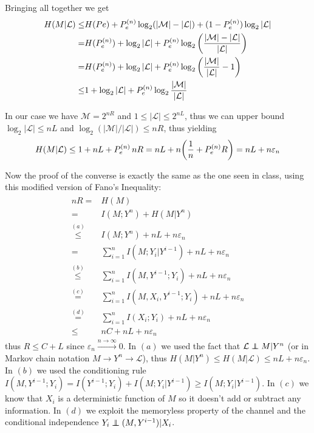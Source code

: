 Bringing all together we get
%
\begin{align}
\begin{split}
H(M|\mathcal{L}) \leq & H(Pe) + P_e^{(n)}\log_2(|\mathcal{M}|-|\mathcal{L}|) + (1-P_e^{(n)})\log_2|\mathcal{L}|\\
=& H(P_e^{(n)}) + \log_2|\mathcal{L}| + P_e^{(n)}\log_2\qty(\frac{|\mathcal{M}|-|\mathcal{L}|}{|\mathcal{L}|})\\
=& H(P_e^{(n)}) + \log_2|\mathcal{L}| + P_e^{(n)}\log_2\qty(\frac{|\mathcal{M}|}{|\mathcal{L}|} - 1)\\
\leq& 1 + \log_2|\mathcal{L}| + P_e^{(n)}\log_2\frac{|\mathcal{M}|}{|\mathcal{L}|}
\end{split}
\end{align}

In our case we have $\mathcal{M}=2^{nR}$ and $1\leq |\mathcal{L}| \leq 2^{nL}$, thus we can upper bound $\log_2|\mathcal{L}| \leq nL$ and $\log_2(|\mathcal{M}|/|\mathcal{L}|) \leq nR$, thus yielding
%
\begin{equation}
H(M|\mathcal{L}) \leq 1+nL+P_e^{(n)} \, nR = nL + n\qty(\frac{1}{n} + P_e^{(n)} R) = nL + n\varepsilon_n
\end{equation}

Now the proof of the converse is exactly the same as the one seen in class, using this modified version of Fano's Inequality:
%
\begin{align}
\begin{split}
nR =& H(M)\\
=&  I(M;Y^n) + H(M|Y^n)\\
\stackrel{(a)}{\leq}& I(M;Y^n) + nL + n\varepsilon_n\\
=& \sum_{i=1}^n I(M;Y_i|Y^{i-1}) + nL+n\varepsilon_n\\
\stackrel{(b)}{\leq}& \sum_{i=1}^n I(M,Y^{i-1};Y_i) + nL+n\varepsilon_n\\
\stackrel{(c)}{=}& \sum_{i=1}^n I(M,X_i,Y^{i-1};Y_i) + nL+n\varepsilon_n\\
\stackrel{(d)}{=}& \sum_{i=1}^n I(X_i;Y_i) + nL+n\varepsilon_n\\
\leq& nC + nL+n\varepsilon_n
\end{split}
\end{align}
%
thus $R\leq C+L$ since $\varepsilon_n \xrightarrow{n\rightarrow\infty} 0$. In $(a)$ we used the fact that $\mathcal{L} \independent M |Y^n$ (or in Markov chain notation $M\rightarrow Y^n\rightarrow \mathcal{L}$), thus $H(M|Y^n)\leq H(M|\mathcal{L}) \leq nL + n\varepsilon_n$. In $(b)$ we used the conditioning rule $I(M,Y^{i-1};Y_i) = I(Y^{i-1};Y_i) + I(M;Y_i|Y^{i-1}) \geq I(M;Y_i|Y^{i-1})$. In $(c)$ we know that $X_i$ is a deterministic function of $M$ so it doesn't add or subtract any information. In $(d)$ we exploit the memoryless property of the channel and the conditional independence $Y_i \independent (M,Y^{i-1})|X_i$.

